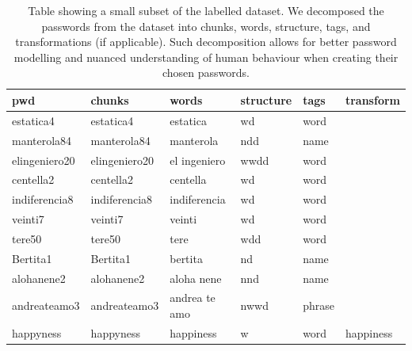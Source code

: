\begin{table}[t]
\centering
\caption{Table showing a small subset of the labelled \hmail dataset. We decomposed the passwords from the \hmail dataset into chunks, words, structure, tags, and transformations (if applicable). Such decomposition allows for better password modelling and nuanced understanding of human behaviour when creating their chosen passwords.}
\label{table:results-snippet}
    \setlength\tabcolsep{6pt} %
\begin{tabular}{llllll}
\toprule
\textbf{pwd} & \textbf{chunks} & \textbf{words} & \textbf{structure} & \textbf{tags} & \textbf{transform} \\
\midrule
estatica4 & \colorbox[HTML]{A1EEBD}{estatica}\colorbox[HTML]{F6F7C4}{4} & estatica & wd & word & \\
manterola84 & \colorbox[HTML]{A1EEBD}{manterola}\colorbox[HTML]{F6F7C4}{84} & manterola & ndd & name & \\
elingeniero20 & \colorbox[HTML]{A1EEBD}{el}\colorbox[HTML]{F6F7C4}{ingeniero}\colorbox[HTML]{F6D6D6}{20} & el ingeniero & wwdd & word & \\
centella2 & \colorbox[HTML]{A1EEBD}{centella}\colorbox[HTML]{F6F7C4}{2} & centella & wd & word & \\
indiferencia8 & \colorbox[HTML]{A1EEBD}{indiferencia}\colorbox[HTML]{F6F7C4}{8} & indiferencia & wd & word & \\
veinti7 & \colorbox[HTML]{A1EEBD}{veinti}\colorbox[HTML]{F6F7C4}{7} & veinti & wd & word & \\
tere50 & \colorbox[HTML]{A1EEBD}{tere}\colorbox[HTML]{F6F7C4}{50} & tere & wdd & word & \\
Bertita1 & \colorbox[HTML]{A1EEBD}{Bertita}\colorbox[HTML]{F6F7C4}{1} & bertita & nd & name & \\
alohanene2 & \colorbox[HTML]{A1EEBD}{aloha}\colorbox[HTML]{F6F7C4}{nene}\colorbox[HTML]{F6D6D6}{2} & aloha nene & nnd & name & \\
andreateamo3 & \colorbox[HTML]{A1EEBD}{andrea}\colorbox[HTML]{F6F7C4}{te}\colorbox[HTML]{F6D6D6}{amo}\colorbox[HTML]{7BD3EA}{3} & andrea te amo & nwwd & phrase & \\
happyness & \colorbox[HTML]{A1EEBD}{happyness} & happiness & w & word & happiness \\
\bottomrule
\end{tabular}
\end{table}

